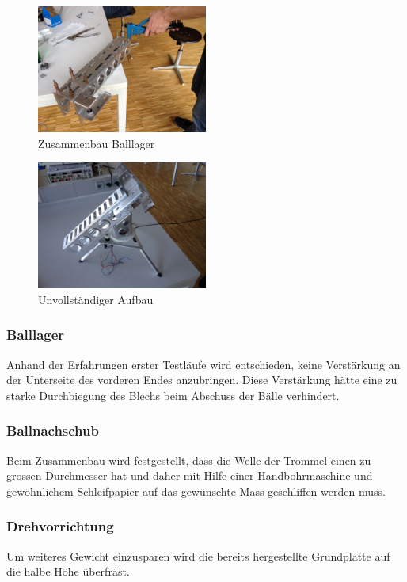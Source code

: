 \begin{figure}[h!]          
	\centering             
	\includegraphics[width=0.5\textwidth]{fig/IMG_2290.jpg}
	\caption{Zusammenbau Balllager}
	\label{fig:Zusammenbau Balllager}        
\end{figure}

\begin{figure}[h!]          
	\centering             
	\includegraphics[width=0.5\textwidth]{fig/IMG_2303.jpg}
	\caption{Unvollständiger Aufbau}
	\label{fig:Unvollständiger Aufbau}        
\end{figure}

\subsubsection{Balllager}
Anhand der Erfahrungen erster Testläufe wird entschieden, keine Verstärkung an der Unterseite des vorderen Endes anzubringen. Diese Verstärkung hätte eine zu starke Durchbiegung des Blechs beim Abschuss der Bälle verhindert.
\subsubsection{Ballnachschub}
Beim Zusammenbau wird festgestellt, dass die Welle der Trommel einen zu grossen Durchmesser hat und daher mit Hilfe einer Handbohrmaschine und gewöhnlichem Schleifpapier auf das gewünschte Mass geschliffen werden muss.
\subsubsection{Drehvorrichtung}
Um weiteres Gewicht einzusparen wird die bereits hergestellte Grundplatte auf die halbe Höhe überfräst.

